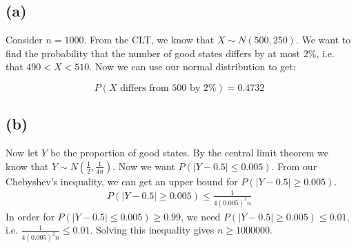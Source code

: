 \documentclass{article}
\begin{document}
	\subsection*{(a)}
	Consider $n = 1000$. From the CLT, we know that $X \sim N(500, 250)$. We want to find the probability that the number of good states differs by at most $2\%$, i.e. that $ 490 < X < 510$. Now we can use our normal distribution to get:
	
	\[ P(X \text{ differs from 500 by $2\%$} ) = 0.4732 \]
	
	\subsection*{(b)}
	Now let $Y$ be the proportion of good states. By the central limit theorem we know that $Y \sim N(\frac{1}{2}, \frac{1}{4n})$. Now we want $P(|Y-0.5|\leq 0.005)$. From our Chebyshev's inequality, we can get an upper bound for $P(|Y- 0.5 |\geq 0.005)$. 
	\begin{align*}
	P(|Y- 0.5 |\geq 0.005) \leq \frac{1}{4(0.005)^2 n}
	\end{align*}
	In order for $P(|Y-0.5| \leq 0.005) \geq 0.99$, we need $P(|Y - 0.5| \geq 0.005) \leq 0.01$, i.e. $\frac{1}{4(0.005)^2 n} \leq 0.01$. Solving this inequality gives $n \geq 1000000$. 
\end{document}
